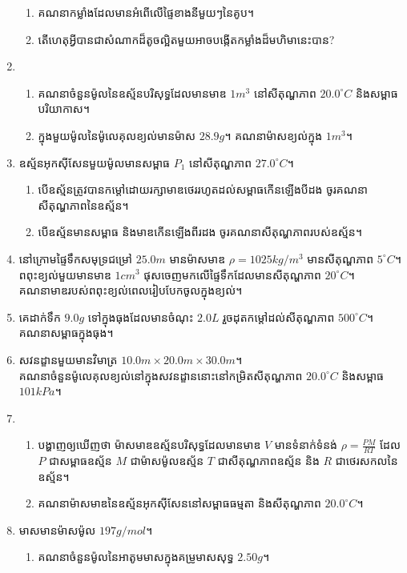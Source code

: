 \begin{enumerate}[m]
\begin{enumerate}[k]
	\item គណនាកម្លាំងដែលមានអំពើលើផ្ទៃខាងនីមួយៗនៃគូប។
	\item តើហេតុអ្វីបានជាសំណាកដ៏តូចល្អិតមួយអាចបង្កើតកម្លាំងដ៏មហិមានេះបាន?
\end{enumerate}
\item \begin{enumerate}[k]
	\item គណនាចំនួនម៉ូលនៃឧស្ម័នបរិសុទ្ធដែលមានមាឌ $1m^{3}$ នៅសីតុណ្ហភាព $20.0^\circ C$ និងសម្ពាធបរិយាកាស។
	\item ក្នុងមួយម៉ូលនៃម៉ូលេគុលខ្យល់មានម៉ាស $28.9g$។ គណនាម៉ាសខ្យល់ក្នុង $1m^{3}$។
\end{enumerate}
\item ឧស្ម័នអុកសុីសែនមួយម៉ូលមានសម្ពាធ $P_{1}$ នៅសីតុណ្ហភាព $27.0^\circ C$។
\begin{enumerate}[k]
	\item បើឧស្ម័នត្រូវបានកម្តៅដោយរក្សាមាឌថេររហូតដល់សម្ពាធកើនឡើងបីដង ចូរគណនាសីតុណ្ហភាពនៃឧស្ម័ន។
	\item បើឧស្ម័នមានសម្ពាធ និងមាឌកើនឡើងពីរដង ចូរគណនាសីតុណ្ហភាពរបស់ឧស្ម័ន។
\end{enumerate}
\item នៅក្រោមផ្ទៃទឹកសមុទ្រជម្រៅ $25.0m$ មានម៉ាសមាឌ $\rho=1025kg/m^{3}$ មានសីតុណ្ហភាព $5^\circ C$។ ពពុះខ្យល់មួយមានមាឌ $1cm^{3}$ ផុសចេញមកលើផ្ទៃទឹកដែលមានសីតុណ្ហភាព $20^\circ C$។\\ គណនាមាឌរបស់ពពុះខ្យល់ពេលរៀបបែកចូលក្នុងខ្យល់។
\newpage
\item គេដាក់ទឹក $9.0g$ ទៅក្នុងធុងដែលមានចំណុះ $2.0L$ រួចដុតកម្តៅដល់សីតុណ្ហភាព $500^\circ C$។ \\គណនាសម្ពាធក្នុងធុង។
\item សវនដ្ខានមួយមានវិមាត្រ $10.0m\times20.0m\times30.0m$។\\ គណនាចំនួនម៉ូលេគុលខ្យល់នៅក្នុងសវនដ្ខាននោះនៅកម្រិតសីតុណ្ហភាព $20.0^\circ C$ និងសម្ពាធ $101kPa$។
\item \begin{enumerate}[k]
	\item បង្ហាញឲ្យឃើញថា ម៉ាសមាឌឧស្ម័នបរិសុទ្ធដែលមានមាឌ $V$ មានទំនាក់ទំនង់ $\rho =\frac{PM}{RT}$ ដែល $P$ ជាសម្ពាធឧស្ម័ន $M$ ជាម៉ាសម៉ូលឧស្ម័ន $T$ ជាសីតុណ្ហភាពឧស្ម័ន និង $R$ ជាថេរសកលនៃឧស្ម័ន។
	\item គណនាម៉ាសមាឌនៃឧស្ម័នអុកសុីសែននៅសម្ពាធធម្មតា និងសីតុណ្ហភាព $20.0^\circ C$។
\end{enumerate}
\item មាសមានម៉ាសម៉ូល $197g/mol$។
\begin{enumerate}[k]
	\item គណនាចំនួនម៉ូលនៃអាតូមមាសក្នុងគម្រូមាសសុទ្ធ $2.50g$។

\end{enumerate}
\end{enumerate}
